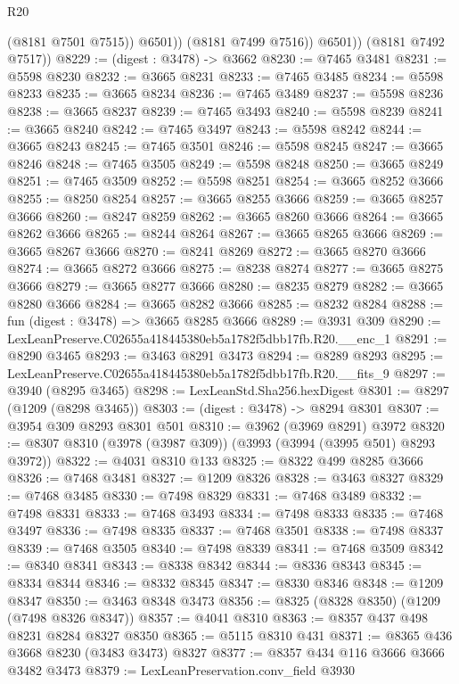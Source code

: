 \begin{lexlean}{R20}
\begin{coremodule}
                  (@8181 @7501 @7515))
                @6501))
            (@8181 @7499 @7516))
          @6501))
      (@8181 @7492 @7517))
@8229 := (digest : @3478) -> @3662
@8230 := @7465 @3481
@8231 := @5598 @8230
@8232 := @3665 @8231
@8233 := @7465 @3485
@8234 := @5598 @8233
@8235 := @3665 @8234
@8236 := @7465 @3489
@8237 := @5598 @8236
@8238 := @3665 @8237
@8239 := @7465 @3493
@8240 := @5598 @8239
@8241 := @3665 @8240
@8242 := @7465 @3497
@8243 := @5598 @8242
@8244 := @3665 @8243
@8245 := @7465 @3501
@8246 := @5598 @8245
@8247 := @3665 @8246
@8248 := @7465 @3505
@8249 := @5598 @8248
@8250 := @3665 @8249
@8251 := @7465 @3509
@8252 := @5598 @8251
@8254 := @3665 @8252 @3666
@8255 := @8250 @8254
@8257 := @3665 @8255 @3666
@8259 := @3665 @8257 @3666
@8260 := @8247 @8259
@8262 := @3665 @8260 @3666
@8264 := @3665 @8262 @3666
@8265 := @8244 @8264
@8267 := @3665 @8265 @3666
@8269 := @3665 @8267 @3666
@8270 := @8241 @8269
@8272 := @3665 @8270 @3666
@8274 := @3665 @8272 @3666
@8275 := @8238 @8274
@8277 := @3665 @8275 @3666
@8279 := @3665 @8277 @3666
@8280 := @8235 @8279
@8282 := @3665 @8280 @3666
@8284 := @3665 @8282 @3666
@8285 := @8232 @8284
@8288 := fun (digest : @3478) => @3665 @8285 @3666
@8289 := @3931 @309
@8290 := LexLeanPreserve.C02655a418445380eb5a1782f5dbb17fb.R20.__enc_1
@8291 := @8290 @3465
@8293 := @3463 @8291 @3473
@8294 := @8289 @8293
@8295 := LexLeanPreserve.C02655a418445380eb5a1782f5dbb17fb.R20.__fits_9
@8297 := @3940 (@8295 @3465)
@8298 := LexLeanStd.Sha256.hexDigest
@8301 := @8297 (@1209 (@8298 @3465))
@8303 := (digest : @3478) -> @8294 @8301
@8307 := @3954 @309 @8293 @8301 @501
@8310 := @3962 (@3969 @8291) @3972
@8320 := @8307 @8310 (@3978 (@3987 @309)) (@3993 (@3994 (@3995 @501) @8293 @3972))
@8322 := @4031 @8310 @133
@8325 := @8322 @499 @8285 @3666
@8326 := @7468 @3481
@8327 := @1209 @8326
@8328 := @3463 @8327
@8329 := @7468 @3485
@8330 := @7498 @8329
@8331 := @7468 @3489
@8332 := @7498 @8331
@8333 := @7468 @3493
@8334 := @7498 @8333
@8335 := @7468 @3497
@8336 := @7498 @8335
@8337 := @7468 @3501
@8338 := @7498 @8337
@8339 := @7468 @3505
@8340 := @7498 @8339
@8341 := @7468 @3509
@8342 := @8340 @8341
@8343 := @8338 @8342
@8344 := @8336 @8343
@8345 := @8334 @8344
@8346 := @8332 @8345
@8347 := @8330 @8346
@8348 := @1209 @8347
@8350 := @3463 @8348 @3473
@8356 := @8325 (@8328 @8350) (@1209 (@7498 @8326 @8347))
@8357 := @4041 @8310
@8363 := @8357 @437 @498 @8231 @8284 @8327 @8350
@8365 := @5115 @8310 @431
@8371 := @8365 @436 @3668 @8230 (@3483 @3473) @8327
@8377 := @8357 @434 @116 @3666 @3666 @3482 @3473
@8379 := LexLeanPreservation.conv_field @3930

\end{coremodule}
\end{lexlean}

